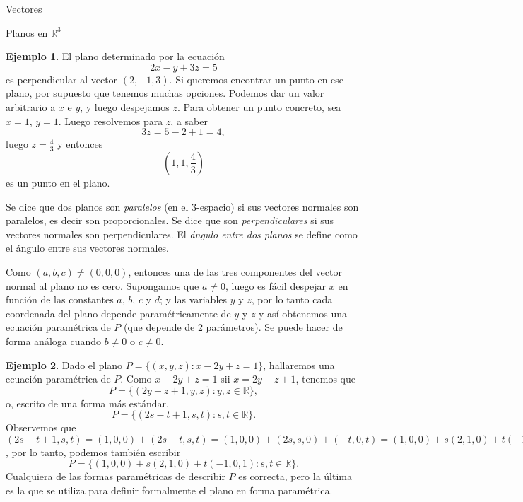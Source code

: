 \documentclass[a4paper,12pt,twoside,spanish,reqno]{amsbook}
\theoremstyle{definition}
\newtheorem{ejemplo}{Ejemplo}[section]
\theoremstyle{remark}
\newcommand{\R}{\mathbb R}
\begin{document}
\begin{chapter}{Vectores}
\begin{section}{Planos en $\R^3$}
		\begin{ejemplo}
			El plano determinado por la ecuación
			\begin{equation*}
				2x - y 	+ 3z = 	5
			\end{equation*}
			es perpendicular al vector $(2, - 1, 3)$. Si queremos encontrar un punto en ese plano, por supuesto que tenemos muchas opciones. Podemos dar un valor arbitrario a $x$ e $y$, y luego despejamos $z$. Para obtener un punto concreto, sea $x = 1$, $y = 1$. Luego resolvemos para $z$, a saber
			\begin{equation*}
				3z 	= 5 - 2 + 1 = 4,
			\end{equation*}
			luego $z = \displaystyle\frac43$ y entonces
			\begin{equation*}
				(1,1,\frac43)
			\end{equation*}
			es un punto en el plano.
		\end{ejemplo}
		
		Se dice que dos planos son \textit{paralelos} (en el 3-espacio) si sus vectores normales son paralelos,  es decir son proporcionales. Se dice que son \textit{perpendiculares} si sus vectores normales son perpendiculares. El \textit{ángulo entre dos planos} se define como el ángulo entre sus vectores normales.
		
		
		
		Como $(a,b,c) \ne (0,0,0)$,  entonces una de las tres componentes del vector normal al plano no es cero. Supongamos que $a\ne 0$,  luego es fácil despejar $x$ en función de las constantes $a$, $b$, $c$ y $d$; y las variables $y$ y $z$, por lo tanto cada coordenada del plano depende paramétricamente de $y$ y $z$ y así obtenemos una ecuación paramétrica de $P$ (que depende de 2 parámetros). Se puede hacer de forma análoga cuando $b\ne 0$ o $c \ne 0$. 
		
		\begin{ejemplo}
			Dado el plano $P = \{(x,y,z): x -2y +z =1\}$,  hallaremos una ecuación paramétrica de $P$. Como  $x -2y +z =1$ sii  $x = 2y-z +1$, tenemos que
			\begin{equation*}
				P = \{(2y-z +1,y,z): y,z \in \R\},
			\end{equation*}
			o,  escrito de una forma más estándar,
			\begin{equation*}
			P = \{(2s-t +1,s,t): s,t \in \R\}. 
			\end{equation*}
			Observemos que $(2s-t +1,s,t) = (1,0,0) + (2s-t,s,t)= (1,0,0) + (2s,s,0) + (-t,0,t) = (1,0,0) + s(2,1,0) + t(-1,0,1) $, por lo tanto, podemos también escribir
			\begin{equation*}
			P = \{(1,0,0) + s(2,1,0) + t(-1,0,1): s,t \in \R\}. 
			\end{equation*}
			Cualquiera de las formas paramétricas de describir $P$  es correcta, pero la última es la que se utiliza para definir formalmente el plano en forma paramétrica. 
			

\end{ejemplo}
\end{section}
\end{chapter}
\end{document}

